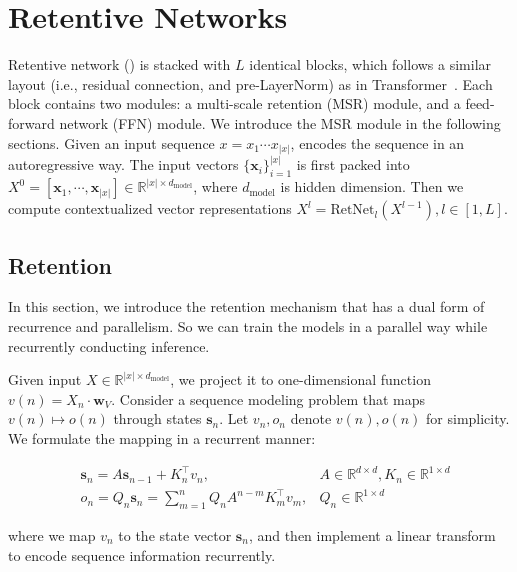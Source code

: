 \vfill{}

\section{Retentive Networks}
\label{sec:retnet}

Retentive network (\our{}) is stacked with $L$ identical blocks, which follows a similar layout (i.e., residual connection, and pre-LayerNorm) as in Transformer~\cite{transformer}. Each \our{} block contains two modules: a multi-scale retention (MSR) module, and a feed-forward network (FFN) module. We introduce the MSR module in the following sections. Given an input sequence $x = x_{1} \cdots x_{|x|}$, \our{} encodes the sequence in an autoregressive way. The input vectors $\{{\bm{x}}_i\}_{i=1}^{|x|}$ is first packed into $X^0 = [{\bm{x}}_1, \cdots, {\bm{x}}_{|x|}] \in \mathbb{R}^{|x|\times d_\text{model}}$, where $d_\text{model}$ is hidden dimension. Then we compute contextualized vector representations $X^l = \mathrm{RetNet}_{l}(X^{l-1}), l \in [1, L]$.

\subsection{Retention}
\label{sec:retention}

In this section, we introduce the retention mechanism that has a dual form of recurrence and parallelism. So we can train the models in a parallel way while recurrently conducting inference.

Given input $X \in \mathbb{R}^{|x|\times d_\text{model}}$, we project it to one-dimensional function $v(n) = X_n \cdot {\bm{w}}_V$.
Consider a sequence modeling problem that maps $v(n) \mapsto o(n)$ through states ${\bm{s}}_n$. Let $v_n, o_n$ denote $v(n), o(n)$ for simplicity. We formulate the mapping in a recurrent manner:

\begin{equation}
\begin{aligned}
\label{eq:rnn}
&{\bm{s}}_n = A{\bm{s}}_{n-1} + K_n^\intercal v_n, &A\in\mathbb{R}^{d\times d}, K_n\in\mathbb{R}^{1\times d} \\
&o_n = Q_n{\bm{s}}_n = \sum_{m=1}^n Q_n A^{n - m} K_m^\intercal v_m, &Q_n\in\mathbb{R}^{1\times d}
\end{aligned}
\end{equation}

where we map $v_n$ to the state vector ${\bm{s}}_n$, and then implement a linear transform to encode sequence information recurrently.

